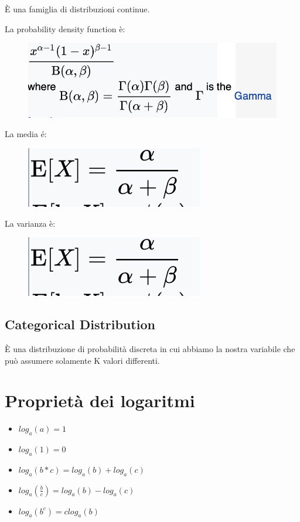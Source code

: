 \documentclass[14pt]{extreport}
\begin{document}
È una famiglia di distribuzioni continue.

La probability density function è:

\begin{figure}[H]
\centering
\includegraphics[width=0.5\linewidth]{124.jpeg}
\end{figure}

La media é:
\begin{figure}[H]
\centering
\includegraphics[width=0.4\linewidth]{125.jpeg}
\end{figure}

La varianza è:
\begin{figure}[H]
\centering
\includegraphics[width=0.4\linewidth]{125.jpeg}
\end{figure}

\subsection{Categorical Distribution}

È una distribuzione di probabilità discreta in cui abbiamo la nostra variabile che può assumere solamente K valori differenti.


\section{Proprietà dei logaritmi}

\begin{itemize}
\item $log_a(a) = 1$
\item $log_a(1) = 0$
\item $log_a(b*c) = log_a(b)+log_a(c)$
\item $log_a(\frac{b}{c}) = log_a(b)-log_a(c)$ 
\item $log_a(b^c) = clog_a(b)$
\end{itemize}
\end{document}
